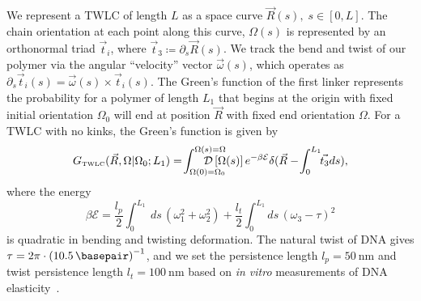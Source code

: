 \documentclass[%
 reprint,
superscriptaddress,
showpacs,preprintnumbers,
 amsmath,amssymb,
 aps,
 prl,
]{revtex4-1}
\newcommand{\gwlc}[2][\Omega_0; L_0]{G_\text{\tiny TWLC}(#2|#1)}
\newcommand{\pathd}[1]{\mathcal{D}\left[#1\right]}
\newcommand{\energy}{\mathcal{E}}
\begin{document}
We represent a TWLC of length $L$ as a space curve $\vec{R}(s),\;s\in[0,L]$.
The chain orientation at each point along this curve, $\Omega(s)$ is represented
    by an orthonormal triad $\vec{t}_{i}$, where $\vec{t}_{3} \coloneqq
    \partial_s \vec{R}(s)$.
We track the bend and twist of our polymer via the angular ``velocity'' vector
    $\vec{\omega}(s)$, which operates as $\partial_s \vec{t}_{i}(s) =
    \vec{\omega}(s) \times \vec{t}_{i}(s)$.
The Green's function of the first linker represents the probability for a
    polymer of length $L_1$ that begins at the origin with fixed initial
    orientation $\Omega_0$ will end at position $\vec{R}$ with fixed end
    orientation $\Omega$.
For a TWLC with no kinks, the Green's function is given by
    \begin{equation}\label{eq:path}
        \gwlc[\Omega_0;L_1]{\vec{R}, \Omega} =\! \int_{\Omega(0)=\Omega_0}^{\Omega(s)=\Omega}
        \hspace{-0.3in}
        \pathd{\Omega(s)}
                e^{-\beta \mathcal{E}}\delta(\vec{R} - \!\int_{0}^{L_1} \!\!\vec{t_3} ds),
    \end{equation}
    where the energy
    \begin{equation}\label{eq:energy}
        \beta\energy = \frac{l_p}{2}\int_{0}^{L_1} \!\ \! ds \,
        (\omega_1^2 + \omega_2 ^2) + \frac{l_t}{2}\int_{0}^{L_1} \! \! ds \,
        {\left(\omega_3 - \tau\right)}^2
    \end{equation}
    is quadratic in bending and twisting deformation.
The natural twist of DNA gives $\tau = 2 \pi \cdot {(\SI{10.5}{\basepair})}^{-1}$,
    and we set the persistence length $l_p = \SI{50}{\nano\metre}$ and twist
    persistence length {$l_t = \SI{100}{\nano\metre}$} based on \emph{in vitro}
    measurements of DNA elasticity~\cite{hagerman1988,rittman2009,bryant2003}.
\end{document}
